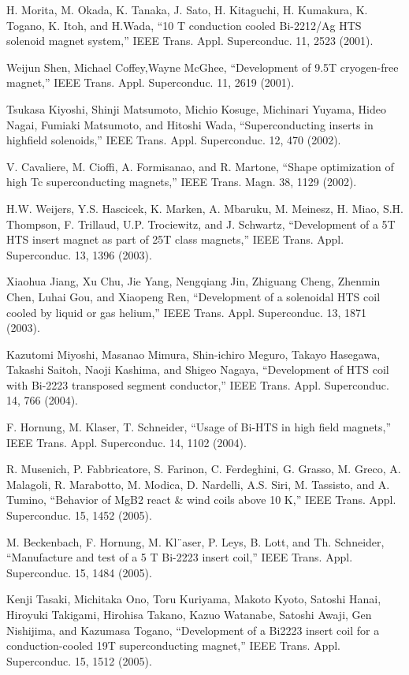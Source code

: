 \noindent [9.355] H. Morita, M. Okada, K. Tanaka, J. Sato, H. Kitaguchi, H. Kumakura, K. Togano,
K. Itoh, and H.Wada, ``10 T conduction cooled Bi-2212/Ag HTS solenoid magnet
system,” IEEE Trans. Appl. Superconduc. 11, 2523 (2001).

\noindent [9.356] Weijun Shen, Michael Coffey,Wayne McGhee, ``Development of 9.5T cryogen-free
magnet,” IEEE Trans. Appl. Superconduc. 11, 2619 (2001).

\noindent [9.357] Tsukasa Kiyoshi, Shinji Matsumoto, Michio Kosuge, Michinari Yuyama, Hideo
Nagai, Fumiaki Matsumoto, and Hitoshi Wada, ``Superconducting inserts in highfield
solenoids,” IEEE Trans. Appl. Superconduc. 12, 470 (2002).

\noindent [9.358] V. Cavaliere, M. Cioffi, A. Formisanao, and R. Martone, ``Shape optimization of
high Tc superconducting magnets,” IEEE Trans. Magn. 38, 1129 (2002).

\noindent [9.359] H.W. Weijers, Y.S. Hascicek, K. Marken, A. Mbaruku, M. Meinesz, H. Miao,
S.H. Thompson, F. Trillaud, U.P. Trociewitz, and J. Schwartz, ``Development
of a 5T HTS insert magnet as part of 25T class magnets,” IEEE Trans. Appl.
Superconduc. 13, 1396 (2003).

\noindent [9.360] Xiaohua Jiang, Xu Chu, Jie Yang, Nengqiang Jin, Zhiguang Cheng, Zhenmin
Chen, Luhai Gou, and Xiaopeng Ren, ``Development of a solenoidal HTS coil
cooled by liquid or gas helium,” IEEE Trans. Appl. Superconduc. 13, 1871 (2003).

\noindent [9.361] Kazutomi Miyoshi, Masanao Mimura, Shin-ichiro Meguro, Takayo Hasegawa,
Takashi Saitoh, Naoji Kashima, and Shigeo Nagaya, ``Development of HTS coil
with Bi-2223 transposed segment conductor,” IEEE Trans. Appl. Superconduc.
14, 766 (2004).

\noindent [9.362] F. Hornung, M. Klaser, T. Schneider, ``Usage of Bi-HTS in high field magnets,”
IEEE Trans. Appl. Superconduc. 14, 1102 (2004).

\noindent [9.363] R. Musenich, P. Fabbricatore, S. Farinon, C. Ferdeghini, G. Grasso, M. Greco,
A. Malagoli, R. Marabotto, M. Modica, D. Nardelli, A.S. Siri, M. Tassisto, and
A. Tumino, ``Behavior of MgB2 react \& wind coils above 10 K,” IEEE Trans.
Appl. Superconduc. 15, 1452 (2005).

\noindent [9.364] M. Beckenbach, F. Hornung, M. Kl¨aser, P. Leys, B. Lott, and Th. Schneider,
``Manufacture and test of a 5 T Bi-2223 insert coil,” IEEE Trans. Appl. Superconduc.
15, 1484 (2005).

\noindent [9.365] Kenji Tasaki, Michitaka Ono, Toru Kuriyama, Makoto Kyoto, Satoshi Hanai,
Hiroyuki Takigami, Hirohisa Takano, Kazuo Watanabe, Satoshi Awaji, Gen
Nishijima, and Kazumasa Togano, ``Development of a Bi2223 insert coil for a
conduction-cooled 19T superconducting magnet,” IEEE Trans. Appl. Superconduc.
15, 1512 (2005).

